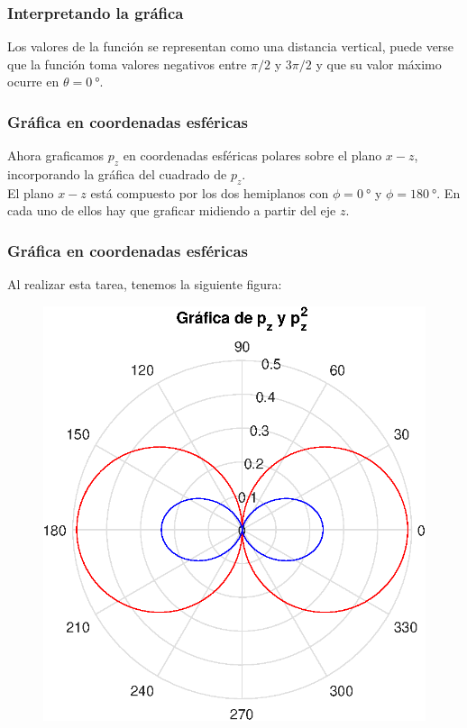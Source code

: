 \documentclass[12pt]{beamer}
\begin{document}
\begin{frame}
\frametitle{Interpretando la gráfica}
Los valores de la función se representan como una distancia vertical, puede verse que la función toma valores negativos entre $\pi/2$ y $3 \pi/2$ y que su valor máximo ocurre en $\theta = \SI{0}{\degree}$.
\end{frame}
\begin{frame}
\frametitle{Gráfica en coordenadas esféricas}
Ahora graficamos $p_{z}$ en coordenadas esféricas polares sobre el plano $x-z$, incorporando la gráfica del cuadrado de $p_{z}$.
\\
\bigskip
\pause
El plano $x-z$ está compuesto por los dos hemiplanos con $\phi = \SI{0}{\degree}$ y $\phi = \SI{180}{\degree}$. \pause En cada uno de ellos hay que graficar midiendo a partir del eje $z$.
\end{frame}
\begin{frame}
\frametitle{Gráfica en coordenadas esféricas}
Al realizar esta tarea, tenemos la siguiente figura:
\pause
\begin{figure}[H]
    \centering
    \includegraphics[scale=0.55]{Imagenes/Plot_AER_pz_theta_pz.eps}
\end{figure}
\end{frame}
\end{document}
